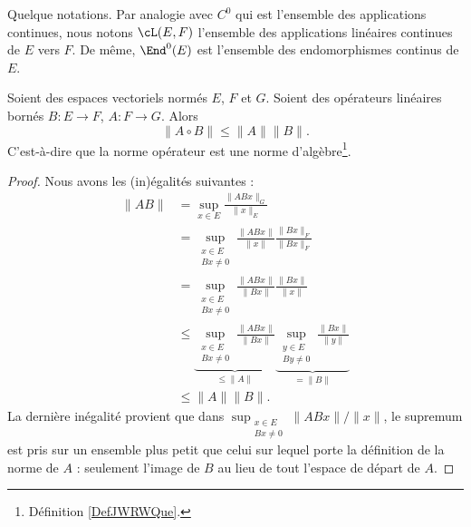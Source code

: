 \begin{normaltext}		\label{NORMooUKURooIkcRoS}
	Quelque notations. Par analogie avec \( C^0\) qui est l'ensemble des applications continues, nous notons \( \cL(E,F)\) l'ensemble des applications linéaires continues de \( E\) vers \( F\). De même, \( \End^0(E)\) est l'ensemble des endomorphismes continus de \( E\).
\end{normaltext}


\begin{lemma}   \label{LEMooFITMooBBBWGI}
	Soient des espaces vectoriels normés \( E\), \( F\) et \( G\). Soient des opérateurs linéaires bornés \( B\colon E\to F\), \( A\colon F\to G\). Alors
	\begin{equation}
		\| A\circ B \|\leq \| A \|\| B \|.
	\end{equation}
	C'est-à-dire que la norme opérateur est une norme d'algèbre\footnote{Définition \ref{DefJWRWQue}.}.
\end{lemma}

\begin{proof}
	Nous avons les (in)égalités suivantes :
	\begin{subequations}
		\begin{align}
			\| AB \| & =\sup_{x\in E}\frac{ \| ABx \|_G }{ \| x \|_E } \\
			         & =\sup_{\substack{x\in E                         \\Bx\neq 0}}\frac{ \| ABx \| }{ \| x \| }\frac{ \| Bx \|_F }{ \| Bx \|_F }\\
			         & =\sup_{\substack{x\in E                         \\Bx\neq 0}}\frac{ \| ABx \| }{ \| Bx \| }\frac{ \| Bx \| }{ \| x \| }\\
			         & \leq\underbrace{\sup_{\substack{x\in E          \\Bx\neq 0}}\frac{ \| ABx \| }{ \| Bx \| }}_{\leq\| A \|}\underbrace{\sup_{\substack{y\in E\\By\neq 0}}\frac{ \| Bx \| }{ \| y \| }}_{=\| B \|}\\
			         & \leq \| A \|\| B \|.
		\end{align}
	\end{subequations}
	La dernière inégalité provient que dans \( \sup_{\substack{x\in E\\Bx\neq 0}}\| ABx \|/\| x \|\), le supremum est pris sur un ensemble plus petit que celui sur lequel porte la définition de la norme de \( A\) : seulement l'image de \( B\) au lieu de tout l'espace de départ de \( A\).
\end{proof}

